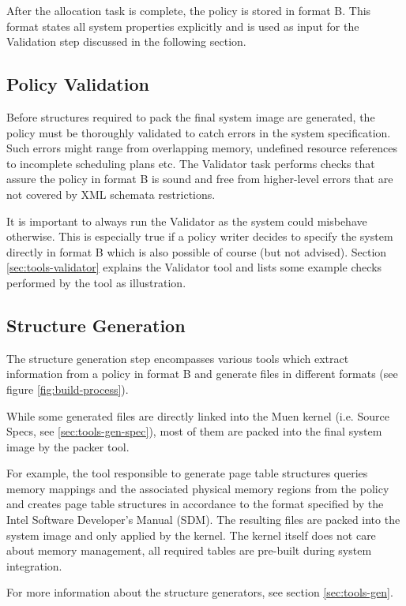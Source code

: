 \documentclass[a4paper,twoside,titlepage]{article}
\begin{document}
After the allocation task is complete, the policy is stored in format B. This
format states all system properties explicitly and is used as input for the
Validation step discussed in the following section.

\subsection{Policy Validation}
\label{subsec:policy_validation}
Before structures required to pack the final system image are generated, the
policy must be thoroughly validated to catch errors in the system
specification.  Such errors might range from overlapping memory, undefined
resource references to incomplete scheduling plans etc. The Validator task
performs checks that assure the policy in format B is sound and free from
higher-level errors that are not covered by XML schemata restrictions.

It is important to always run the Validator as the system could misbehave
otherwise. This is especially true if a policy writer decides to specify the
system directly in format B which is also possible of course (but not advised).
Section \ref{sec:tools-validator} explains the Validator tool and lists some
example checks performed by the tool as illustration.

\subsection{Structure Generation}
The structure generation step encompasses various tools which extract
information from a policy in format B and generate files in different formats
(see figure \ref{fig:build-process}).

While some generated files are directly linked into the Muen kernel (i.e.
Source Specs, see \ref{sec:tools-gen-spec}), most of them are packed into the
final system image by the packer tool.

For example, the tool responsible to generate page table structures queries
memory mappings and the associated physical memory regions from the policy and
creates page table structures in accordance to the format specified by the
Intel Software Developer's Manual (SDM). The resulting files are packed into
the system image and only applied by the kernel. The kernel itself does not
care about memory management, all required tables are pre-built during system
integration.

For more information about the structure generators, see section
\ref{sec:tools-gen}.
\end{document}
